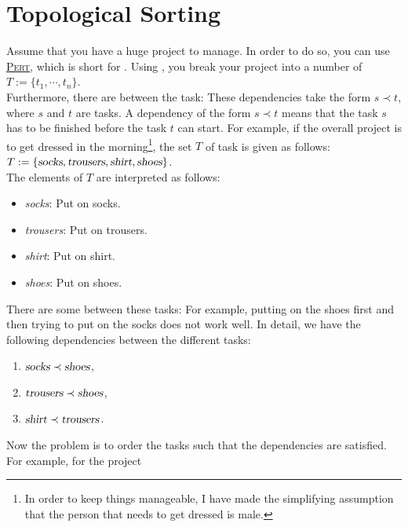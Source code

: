 \section{Topological Sorting}
Assume that you have a huge project to manage.  In order to do so, you can use 
\href{https://en.wikipedia.org/wiki/Program_evaluation_and_review_technique}{\textsc{Pert}}, which is short for
.  Using ,
you break your project into a number of 
\\[0.2cm]
\hspace*{1.3cm}
$T := \{t_1,\cdots,t_n\}$.  
\\[0.2cm]
Furthermore, there are  between the task: These dependencies take the form $s \prec t$, where $s$ and
$t$ are tasks.  A dependency of the form $s \prec t$ means that the task $s$ has to be finished before the task $t$
can start.  For example, if the overall project is to get dressed in the morning\footnote{
  In order to keep things manageable, I have made the simplifying assumption that the person that needs to get
  dressed is male. 
}, the set $T$ of task is given
as follows:
\\[0.2cm]
\hspace*{1.3cm}
$T := \{ \textsl{socks}, \textsl{trousers}, \textsl{shirt}, \textsl{shoes} \}$.
\\[0.2cm]
The elements of $T$ are interpreted as follows:
\begin{itemize}
\item \textsl{socks}: Put on socks.
\item \textsl{trousers}: Put on trousers.
\item \textsl{shirt}: Put on shirt.
\item \textsl{shoes}: Put on shoes.
\end{itemize}
There are some  between these tasks:  For example, putting on the shoes first and then trying to
put on the socks does not work well.  In detail, we have the following dependencies between the different tasks:
\begin{enumerate}
\item $\textsl{socks} \prec \textsl{shoes}$,
\item $\textsl{trousers} \prec \textsl{shoes}$,
\item $\textsl{shirt} \prec \textsl{trousers}$.
\end{enumerate}
Now the problem is to order the tasks such that the dependencies are satisfied.  For example, for the project
